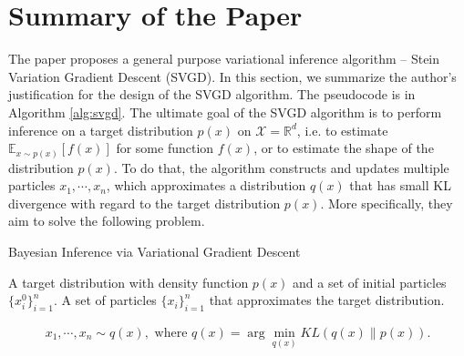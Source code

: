 \section{Summary of the Paper}

The paper proposes a general purpose variational inference algorithm -- Stein Variation Gradient Descent (SVGD). In this section, we summarize the author's justification for the design of the SVGD algorithm. The pseudocode is in Algorithm \ref{alg:svgd}. The ultimate goal of the SVGD algorithm is to perform inference on a target distribution $p(x)$ on $\mathcal{X}=\mathbb{R}^d$, i.e. to estimate $\mathbb{E}_{x\sim p(x)}[f(x)]$ for some function $f(x)$, or to estimate the shape of the distribution $p(x)$. To do that, the algorithm constructs and updates multiple particles $x_1, \cdots, x_n$, which approximates a distribution $q(x)$ that has small KL divergence with regard to the target distribution $p(x)$. More specifically, they aim to solve the following problem.



\begin{algorithm}[t!]
	\caption{Bayesian Inference via Variational Gradient Descent~\cite{ref_article_svgd}}
	\label{alg:svgd}
	\begin{algorithmic}
		 A target distribution with density function $p(x)$ and a set of initial particles $\{x_i^0\}_{i=1}^n$.
		 A set of particles $\{x_i\}_{i=1}^n$ that approximates the target distribution.
		\ENDFOR
	\end{algorithmic}
\end{algorithm}

\begin{align}
    x_1,\cdots,x_n\sim q(x), \text{ where }q(x) = \arg\min_{q(x)} KL(q(x)\lVert p(x)).
\end{align}

